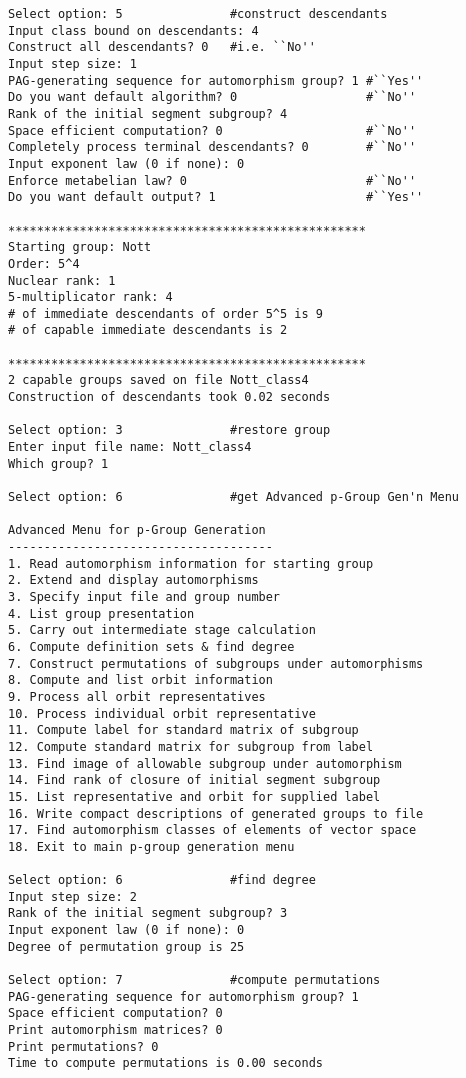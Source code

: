 \documentclass[12pt]{article}
\begin{document}
\begin{verbatim}
Select option: 5               #construct descendants
Input class bound on descendants: 4
Construct all descendants? 0   #i.e. ``No''
Input step size: 1
PAG-generating sequence for automorphism group? 1 #``Yes''
Do you want default algorithm? 0                  #``No''
Rank of the initial segment subgroup? 4
Space efficient computation? 0                    #``No''
Completely process terminal descendants? 0        #``No''
Input exponent law (0 if none): 0
Enforce metabelian law? 0                         #``No''
Do you want default output? 1                     #``Yes''

**************************************************
Starting group: Nott
Order: 5^4
Nuclear rank: 1
5-multiplicator rank: 4
# of immediate descendants of order 5^5 is 9
# of capable immediate descendants is 2

**************************************************
2 capable groups saved on file Nott_class4
Construction of descendants took 0.02 seconds

Select option: 3               #restore group
Enter input file name: Nott_class4
Which group? 1

Select option: 6               #get Advanced p-Group Gen'n Menu

Advanced Menu for p-Group Generation
-------------------------------------
1. Read automorphism information for starting group
2. Extend and display automorphisms
3. Specify input file and group number
4. List group presentation
5. Carry out intermediate stage calculation
6. Compute definition sets & find degree
7. Construct permutations of subgroups under automorphisms
8. Compute and list orbit information
9. Process all orbit representatives
10. Process individual orbit representative
11. Compute label for standard matrix of subgroup
12. Compute standard matrix for subgroup from label
13. Find image of allowable subgroup under automorphism
14. Find rank of closure of initial segment subgroup
15. List representative and orbit for supplied label
16. Write compact descriptions of generated groups to file
17. Find automorphism classes of elements of vector space
18. Exit to main p-group generation menu

Select option: 6               #find degree 
Input step size: 2
Rank of the initial segment subgroup? 3
Input exponent law (0 if none): 0
Degree of permutation group is 25

Select option: 7               #compute permutations  
PAG-generating sequence for automorphism group? 1
Space efficient computation? 0
Print automorphism matrices? 0
Print permutations? 0
Time to compute permutations is 0.00 seconds


\end{verbatim}
\end{document}
